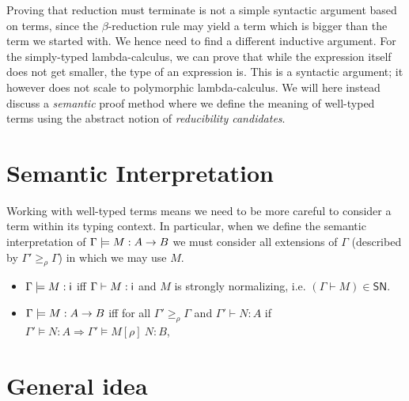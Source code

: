 \documentclass{article}
\newcommand{\ext}[1]{\geq_{#1}}
\newcommand{\SN}{\mathsf{SN}}
\newcommand{\imply}{\Longrightarrow}
\def\lv{\mathopen{{[\kern-0.14em[}}}    %
\def\rv{\mathclose{{]\kern-0.14em]}}}   %
\newcommand{\den}[1]{\lv #1 \rv}
\begin{document}
Proving that reduction must terminate is not a simple syntactic argument based on terms, since the $\beta$-reduction rule may yield a term which is bigger than the term we started with. We hence need to find a different inductive argument. For the simply-typed lambda-calculus, we can prove that while the expression itself does not get smaller,  the type of an expression is. This is a syntactic argument; it however does not scale to polymorphic lambda-calculus. We will here instead discuss a \emph{semantic} proof method where we define the meaning of well-typed terms using the abstract notion of \emph{reducibility candidates}. 



\section{Semantic Interpretation}
Working with well-typed terms means we need to be more careful to
consider a term within its typing context. In particular, when we
define the semantic interpretation of $\Gamma \models M : A \rightarrow B$
we must consider all extensions of $\Gamma$ (described by $\Gamma'
\ext \rho \Gamma$) in which we may use $M$.

\begin{itemize}
\item $\Gamma \models M : \textsf{i}$ iff $\Gamma \vdash M\mathrel{:} \textsf{i}$ and $M$ is strongly normalizing, i.e. $(\Gamma \vdash M) \in \SN$.
\item $\Gamma \models M : A \rightarrow B$ iff for all $\Gamma' \ext{\rho} \Gamma$ and $\Gamma' \vdash N :A$ if $\Gamma' \models N : A \imply \Gamma' \models M[\rho]~N : B$,
\end{itemize}




\section{General idea}
\end{document}
